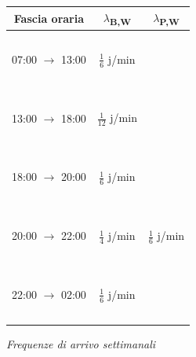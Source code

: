 \documentclass[a4paper, 12pt]{article}
\newcommand{\xmark}[0]{\ding{55}}
\begin{document}
\begin{minipage}{.5\textwidth}
\centering             
\begin{tabular}{ |c|c|c| }
	\hline
    \cellcolor{cellcolor} Fascia oraria & \cellcolor{cellcolor}$\lambda${\textsubscript{B,W}} & \cellcolor{cellcolor}$\lambda${\textsubscript{P,W}} \\
	\hline
    \hline
   	\ &\ &\ \\
	07:00 $\rightarrow$ 13:00 & $\frac{1}{6}$ j/min & \xmark \\
    \ &\ &\ \\
    \hline
    
    \ &\ &\ \\
	13:00 $\rightarrow$ 18:00 & $\frac{1}{12}$ j/min & \xmark \\
    \ &\ &\ \\
    \hline
    
    \ &\ &\ \\
	18:00 $\rightarrow$ 20:00 & $\frac{1}{6}$ j/min & \xmark \\
    \ &\ &\ \\
    \hline
    
    \ &\ &\ \\
	20:00 $\rightarrow$ 22:00 & $\frac{1}{4}$ j/min & $\frac{1}{6}$ j/min \\
    \ &\ &\ \\
    \hline
    
    \ &\ &\ \\
	22:00 $\rightarrow$ 02:00 & $\frac{1}{6}$ j/min & \xmark \\
    \ &\ &\ \\
    \hline
\end{tabular}
\bigskip
              
\textit{Frequenze di arrivo settimanali}
\end{minipage}
%
\end{document}
